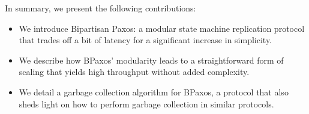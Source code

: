 In summary, we present the following contributions:
\begin{itemize}
  \item
    We introduce Bipartisan Paxos: a modular state machine replication protocol
    that trades off a bit of latency for a significant increase in simplicity.
  \item
    We describe how BPaxos' modularity leads to a straightforward form of
    scaling that yields high throughput without added complexity.
  \item
    We detail a garbage collection algorithm for BPaxos, a protocol that also
    sheds light on how to perform garbage collection in similar protocols.
\end{itemize}

